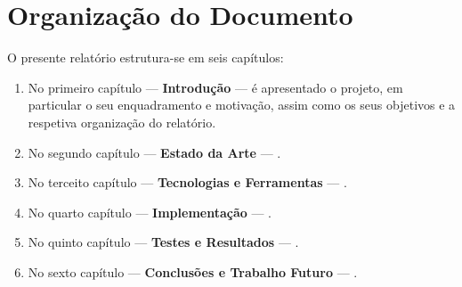 \section{Organização do Documento}
\label{sec::intro:orgdoc}

O presente relatório estrutura-se em seis capítulos:

\begin{enumerate}
	\item No primeiro capítulo --- \textbf{Introdução} --- é apresentado o projeto, em particular o seu enquadramento e motivação, assim como os seus objetivos e a respetiva organização do relatório.
	
	\item No segundo capítulo --- \textbf{Estado da Arte} --- \todo{}.
	
	\item No terceito capítulo --- \textbf{Tecnologias e Ferramentas} --- \todo{}.
	
	\item No quarto capítulo --- \textbf{Implementação} --- \todo{}.
	
	\item No quinto capítulo --- \textbf{Testes e Resultados} --- \todo{}.
	
	\item No sexto capítulo --- \textbf{Conclusões e Trabalho Futuro} --- \todo{}.
\end{enumerate}
